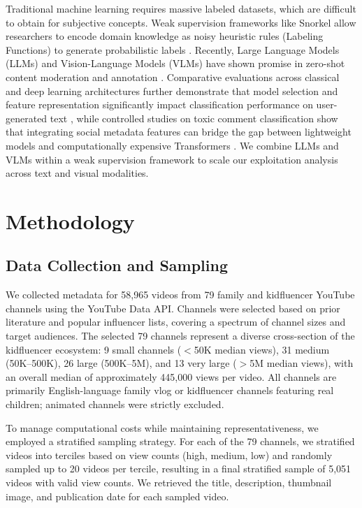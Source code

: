 \documentclass[]{ieeeaccess}
\begin{document}
Traditional machine learning requires massive labeled datasets, which are difficult to obtain for subjective concepts. Weak supervision frameworks like Snorkel \cite{ratner2017snorkel,ratner2016data,bach2019snorkel} allow researchers to encode domain knowledge as noisy heuristic rules (Labeling Functions) to generate probabilistic labels \cite{johnson2022survey}. Recently, Large Language Models (LLMs) and Vision-Language Models (VLMs) have shown promise in zero-shot content moderation and annotation \cite{ma2023adapting,gilardi2023chatgpt,tornberg2024chatgpt}. Comparative evaluations across classical and deep learning architectures further demonstrate that model selection and feature representation significantly impact classification performance on user-generated text \cite{tian2025empirical}, while controlled studies on toxic comment classification show that integrating social metadata features can bridge the gap between lightweight models and computationally expensive Transformers \cite{ding2026feature}. We combine LLMs and VLMs within a weak supervision framework to scale our exploitation analysis across text and visual modalities.

\section{Methodology}

\subsection{Data Collection and Sampling}

We collected metadata for 58,965 videos from 79 family and kidfluencer YouTube channels using the YouTube Data API. Channels were selected based on prior literature and popular influencer lists, covering a spectrum of channel sizes and target audiences. The selected 79 channels represent a diverse cross-section of the kidfluencer ecosystem: 9 small channels ($<$50K median views), 31 medium (50K--500K), 26 large (500K--5M), and 13 very large ($>$5M median views), with an overall median of approximately 445,000 views per video. All channels are primarily English-language family vlog or kidfluencer channels featuring real children; animated channels were strictly excluded.

To manage computational costs while maintaining representativeness, we employed a stratified sampling strategy. For each of the 79 channels, we stratified videos into terciles based on view counts (high, medium, low) and randomly sampled up to 20 videos per tercile, resulting in a final stratified sample of 5,051 videos with valid view counts. We retrieved the title, description, thumbnail image, and publication date for each sampled video.
\end{document}

